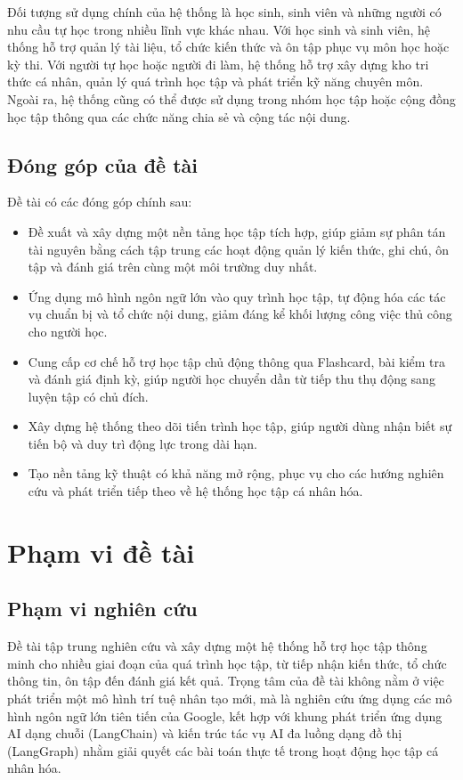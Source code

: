 Đối tượng sử dụng chính của hệ thống là học sinh, sinh viên và những người có nhu cầu tự học trong nhiều lĩnh vực khác nhau. Với học sinh và sinh viên, hệ thống hỗ trợ quản lý tài liệu, tổ chức kiến thức và ôn tập phục vụ môn học hoặc kỳ thi. Với người tự học hoặc người đi làm, hệ thống hỗ trợ xây dựng kho tri thức cá nhân, quản lý quá trình học tập và phát triển kỹ năng chuyên môn. Ngoài ra, hệ thống cũng có thể được sử dụng trong nhóm học tập hoặc cộng đồng học tập thông qua các chức năng chia sẻ và cộng tác nội dung.

\subsection{Đóng góp của đề tài}

Đề tài có các đóng góp chính sau:
\begin{itemize}
    \item Đề xuất và xây dựng một nền tảng học tập tích hợp, giúp giảm sự phân tán tài nguyên bằng cách tập trung các hoạt động quản lý kiến thức, ghi chú, ôn tập và đánh giá trên cùng một môi trường duy nhất.
    \item Ứng dụng mô hình ngôn ngữ lớn vào quy trình học tập, tự động hóa các tác vụ chuẩn bị và tổ chức nội dung, giảm đáng kể khối lượng công việc thủ công cho người học.
    \item Cung cấp cơ chế hỗ trợ học tập chủ động thông qua Flashcard, bài kiểm tra và đánh giá định kỳ, giúp người học chuyển dần từ tiếp thu thụ động sang luyện tập có chủ đích.
    \item Xây dựng hệ thống theo dõi tiến trình học tập, giúp người dùng nhận biết sự tiến bộ và duy trì động lực trong dài hạn.
    \item Tạo nền tảng kỹ thuật có khả năng mở rộng, phục vụ cho các hướng nghiên cứu và phát triển tiếp theo về hệ thống học tập cá nhân hóa.
\end{itemize}


\section{Phạm vi đề tài}
\subsection{Phạm vi nghiên cứu}

Đề tài tập trung nghiên cứu và xây dựng một hệ thống hỗ trợ học tập thông minh cho nhiều giai đoạn của quá trình học tập, từ tiếp nhận kiến thức, tổ chức thông tin, ôn tập đến đánh giá kết quả. Trọng tâm của đề tài không nằm ở việc phát triển một mô hình trí tuệ nhân tạo mới, mà là nghiên cứu ứng dụng các mô hình ngôn ngữ lớn tiên tiến của Google, kết hợp với khung phát triển ứng dụng AI dạng chuỗi (LangChain) và kiến trúc tác vụ AI đa luồng dạng đồ thị (LangGraph) nhằm giải quyết các bài toán thực tế trong hoạt động học tập cá nhân hóa.

